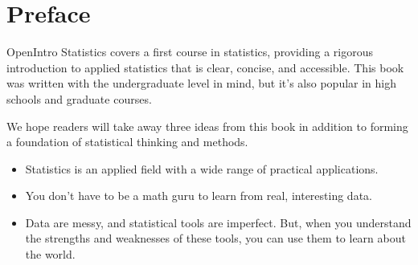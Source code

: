 \chapter*{{\color{oiB}Preface}}

\noindent%
OpenIntro Statistics covers a first course in statistics,
providing a rigorous introduction to applied statistics
that is clear, concise, and accessible.
This book was written with the undergraduate level in mind,
but it's also popular in high schools and graduate courses.
\vspace{3mm}

We hope readers will take away three ideas from
this book in addition to forming a foundation of statistical
thinking and methods.\vspace{-1mm}
\begin{itemize}
\setlength{\itemsep}{0mm}
\item
    Statistics is an applied field with a wide range
    of practical applications.
\item
    You don't have to be a math guru to learn
    from real, interesting data.
\item
    Data are messy, and statistical tools are imperfect.
    But, when you understand the strengths and weaknesses of
    these tools, you can use them to learn about the world.
\end{itemize}


%
%
%


